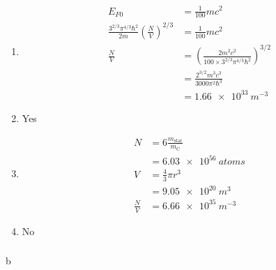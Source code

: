\documentclass{article}
\begin{document}
\begin{enumerate}
  \item

        \begin{align*}
          E_{F 0}                                                                      & = \frac{1}{100} m c^2                                                               \\
          \frac{3^{2 / 3} \pi^{4 / 3} \hbar^2}{2 m} \left( \frac{N}{V} \right)^{2 / 3} & = \frac{1}{100} m c^2                                                               \\
          \frac{N}{V}                                                                  & = \left( \frac{2 m^2 c^2}{100 \times 3^{2 / 3} \pi^{4 / 3} \hbar^2} \right)^{3 / 2} \\
                                                                                       & = \frac{2^{3 / 2} m^3 c^3}{3000 \pi^2 \hbar^3}                                      \\
                                                                                       & = \qty{1.66e33}{m^{-3}}
        \end{align*}

  \item Yes

  \item

        \begin{align*}
          N           & = 6 \frac{m_\text{star}}{m_\text{C}} \\
                      & = \qty{6.03e56}{atoms}               \\
          V           & = \frac{4}{3} \pi r^3                \\
                      & = \qty{9.05e20}{m^3}                 \\
          \frac{N}{V} & = \qty{6.66e35}{m^{-3}}
        \end{align*}

  \item No
\end{enumerate}

\setcounter{subsubsection}{56}
\subsubsection{}

b
\end{document}
